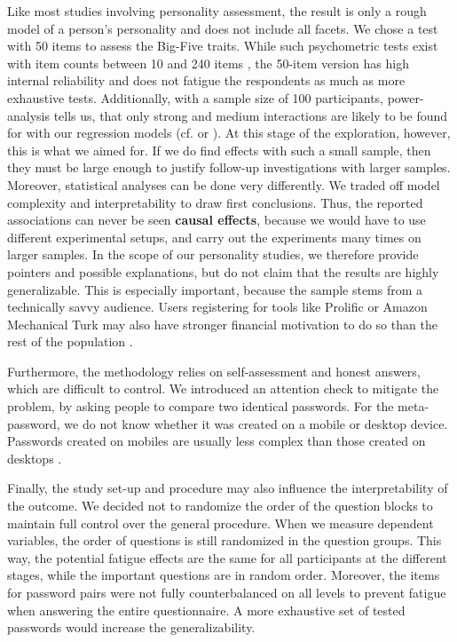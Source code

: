 Like most studies involving personality assessment, the result is only a rough model of a person's personality and does not include all facets. We chose a test with 50 items to assess the Big-Five traits. While such psychometric tests exist with item counts between 10 \cite{Gosling2003TIPI} and 240 items \cite{Costa1992NEO}, the 50-item version has high internal reliability and does not fatigue the respondents as much as more exhaustive tests. Additionally, with a sample size of 100 participants, power-analysis tells us, that only strong and medium interactions are likely to be found for with our regression models (cf. \cite{Shevlin1998SampleSize} or \cite[p. 223]{Field2005DiscoveringStatistics}). At this stage of the exploration, however, this is what we aimed for. If we do find effects with such a small sample, then they must be large enough to justify follow-up investigations with larger samples. Moreover, statistical analyses can be done very differently. We traded off model complexity and interpretability to draw first conclusions. Thus, the reported associations can never be seen \textbf{causal effects}, because we would have to use different experimental setups, and carry out the experiments many times on larger samples. In the scope of our personality studies, we therefore provide pointers and possible explanations, but do not claim that the results are highly generalizable. This is especially important, because the sample stems from a technically savvy audience. Users registering for tools like Prolific or Amazon Mechanical Turk may also have stronger financial motivation to do so than the rest of the population \cite{Ross2010WhoAreTurkers}. 

Furthermore, the methodology relies on self-assessment and honest answers, which are difficult to control. We introduced an attention check to mitigate the problem, by asking people to compare two identical passwords. For the meta-password, we do not know whether it was created on a mobile or desktop device. Passwords created on mobiles are usually less complex than those created on desktops \cite{Melicher2016UsabilityMobileTextPasswords, VonZezschwitz2014HoneyIShrunkTheKeys}. 

Finally, the study set-up and procedure may also influence the interpretability of the outcome. We decided not to randomize the order of the question blocks to maintain full control over the general procedure. When we measure dependent variables, the order of questions is still randomized in the question groups. This way, the potential fatigue effects are the same for all participants at the different stages, while the important questions are in random order. Moreover, the items for password pairs were not fully counterbalanced on all levels to prevent fatigue when answering the entire questionnaire. A more exhaustive set of tested passwords would increase the generalizability. 




